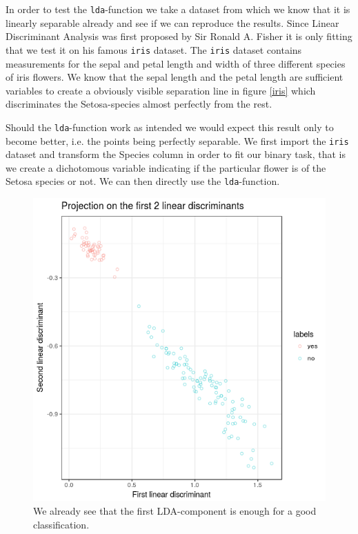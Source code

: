 \documentclass{article}
\begin{document}
In order to test the \texttt{lda}-function we take a dataset from which we know that it is linearly separable already and see if we can reproduce the results. Since Linear Discriminant Analysis was first proposed by Sir Ronald A. Fisher it is only fitting that we test it on his famous \texttt{iris} dataset. The \texttt{iris} dataset contains measurements for the sepal and petal length and width of three different species of iris flowers. We know that the sepal length and the petal length are sufficient variables to create a obviously visible separation line in figure \ref{iris} which discriminates the Setosa-species almost perfectly from the rest. 

Should the \texttt{lda}-function work as intended we would expect this result only to become better, i.e. the points being perfectly separable. We first import the \texttt{iris} dataset and transform the Species column in order to fit our binary task, that is we create a dichotomous variable indicating if the particular flower is of the Setosa species or not. We can then directly use the \texttt{lda}-function.



\begin{figure}
\label{irisLDA}
\begin{center}
\includegraphics[scale=0.3, trim={10mm 20mm 30mm 30mm}]{../LDA/irisLDA.png}
\end{center}
\caption{We already see that the first LDA-component is enough for a good classification.}
\end{figure}
\end{document}

